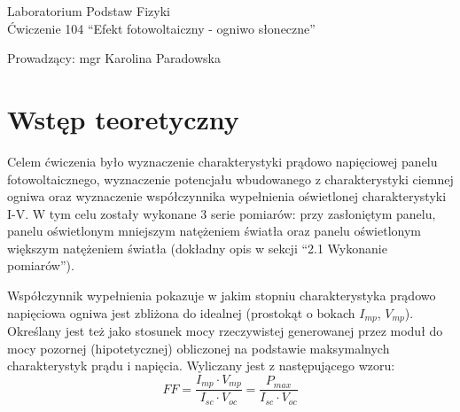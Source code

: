 \documentclass[polish, 11pt, a4paper]{article}
\begin{document}
	\begin{titlepage}
	\centering
	\Huge Laboratorium Podstaw Fizyki\\
	\vspace{1cm}
	\huge Ćwiczenie 104 \enquote{Efekt fotowoltaiczny - ogniwo słoneczne}\\
	\vspace{1cm}
	\raggedright
	\huge Prowadzący: mgr Karolina Paradowska\\
	\vspace{.5cm}
	\begin{table}[h]
		\centering
	\end{table}
	\end{titlepage}
	\section{Wstęp teoretyczny}
		\RaggedRight
		Celem ćwiczenia było wyznaczenie charakterystyki prądowo napięciowej panelu fotowoltaicznego, wyznaczenie potencjału wbudowanego z charakterystyki ciemnej ogniwa oraz wyznaczenie współczynnika wypełnienia oświetlonej charakterystyki I-V.
		W tym celu zostały wykonane 3 serie pomiarów: przy zasłoniętym panelu, panelu oświetlonym mniejszym natężeniem światła oraz panelu oświetlonym większym natężeniem światła (dokładny opis w sekcji \enquote{2.1 Wykonanie pomiarów}).
		
		Współczynnik wypełnienia pokazuje w jakim stopniu charakterystyka prądowo napięciowa ogniwa jest zbliżona do idealnej (prostokąt o bokach \(I_{mp}\), \(V_{mp}\)). Określany jest też jako stosunek mocy rzeczywistej generowanej przez moduł do mocy pozornej (hipotetycznej) obliczonej na podstawie maksymalnych charakterystyk prądu i napięcia.
		Wyliczany jest z następującego wzoru:
		\begin{displaymath}
			FF = \frac{I_{mp}\cdot V_{mp}}{I_{sc}\cdot V_{oc}} = \frac{P_{max}}{I_{sc}\cdot V_{oc}}
		\end{displaymath}
		
\end{document}
